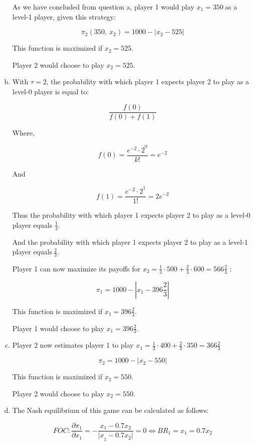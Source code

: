 \documentclass[a4paper]{article}
\begin{document}
\begin{enumerate}[(a)]
As we have concluded from question a, player 1 would play
\(x_{1} = 350\ \)as a level-1 player, given this strategy:

\[\pi_{2}\left( 350,\ x_{2} \right) = 1000 - |x_{2} - 525|\]

This function is maximized if \(x_{2} = 525\).

Player 2 would choose to play \(x_{2} = 525\).

\item

With \(\tau = 2\), the probability with which player 1 expects player 2
to play as a level-0 player is equal to:

\[\frac{f\left( 0 \right)}{f\left( 0 \right) + f\left( 1 \right)}\]

Where,

\[f\left( 0 \right) = \frac{{e^{- 2} \cdot 2}^{0}}{k!} = e^{- 2}\]

And

\[f\left( 1 \right) = \frac{{e^{- 2} \cdot 2}^{1}}{1!} = 2e^{- 2}\]

Thus the probability with which player 1 expects player 2 to play as a
level-0 player equals \(\frac{1}{3}\).

And the probability with which player 1 expects player 2 to play as a
level-1 player equals\(\ \frac{2}{3}\).

Player 1 can now maximize its payoffs for
\(x_{2} = \frac{1}{3} \cdot 500 + \frac{2}{3} \cdot 600 = 566\frac{2}{3}\)
:

\[\pi_{1} = 1000 - |x_{1} - 396\frac{2}{3}|\]

This function is maximized if \(x_{1} = 396\frac{2}{3}\).

Player 1 would choose to play \(x_{1} = 396\frac{2}{3}\).

\item

Player 2 now estimates player 1 to play
\(x_{1} = \frac{1}{3} \cdot 400 + \frac{2}{3} \cdot 350 = 366\frac{2}{3}\)

\[\pi_{2} = 1000 - |x_{2} - 550|\]

This function is maximized if \(x_{2} = 550\).

Player 2 would choose to play \(x_{2} = 550\).

\item

The Nash equilibrium of this game can be calculated as follows:

\[FOC:\frac{\partial\pi_{1}}{\partial x_{1}} = - \frac{x_{1} - 0.7x_{2}}{{|x}_{1} - 0.7x_{2}|} = 0 \Leftrightarrow BR_{1} = x_{1} = 0.7x_{2}\]


\end{enumerate}
\end{document}
